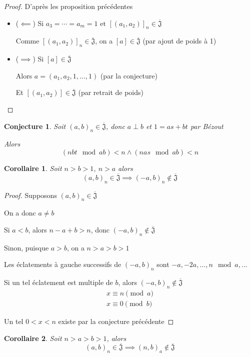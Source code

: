 \documentclass{article}
\newtheorem{conjecture}{Conjecture}
\newtheorem{corollary}{Corollaire}
\newcommand{\J}{\mathfrak{J}}
\newcommand{\JS}{\overline{\J}}
\begin{document}
\begin{proof} D'après les proposition précédentes
    \begin{itemize}
        \item ($\impliedby$) Si $a_3 = \cdots = a_m = 1 \text{ et } {[(a_1, a_2)]}_n \in \JS$
        
            Comme ${[(a_1, a_2)]}_n \in \JS$, on a $[a] \in \JS$ (par ajout de poids à 1)
        \item ($\implies$) Si $[a] \in \JS$

            Alors $a = (a_1, a_2, 1, \dots, 1)$  (par la conjecture)

            Et $[(a_1, a_2)] \in \JS$ (par retrait de poids)
    \end{itemize}
\end{proof}

\newpage

\begin{conjecture}
    Soit ${(a, b)}_n \in \JS$, donc $a \perp b$ et $1 = as + bt$ par Bézout

    Alors \[ (nbt \mod ab) < n \land (nas \mod ab) < n \]
\end{conjecture}

\begin{corollary}
    Soit $n > b > 1$, $n > a$ alors
    \[ {(a, b)}_n \in \JS \implies {(-a, b)}_n \not \in \JS \]
\end{corollary}

\begin{proof}
    Supposons ${(a, b)}_n \in \JS$

    On a donc $a \neq b$

    Si $a < b$, alors $n - a + b > n$, donc ${(-a, b)}_n \not \in \JS$

    Sinon, puisque $a > b$, on a $n > a > b > 1$

    Les éclatements à gauche successifs de ${(-a, b)}_n$ sont $-a, -2a, \ldots, n \mod a, \dots$

    Si un tel éclatement est multiple de $b$, alors ${(-a, b)}_n \not \in \JS$
    \begin{align*}
        x \equiv n \pmod a \\
        x \equiv 0 \pmod b
    \end{align*}

    Un tel $0 < x < n$ existe par la conjecture précédente
\end{proof}

\begin{corollary}
    Soit $n > a > b > 1$, alors
    \[ {(a, b)}_n \in \JS \implies {(n, b)}_a \not \in \JS \]
\end{corollary}
\end{document}
